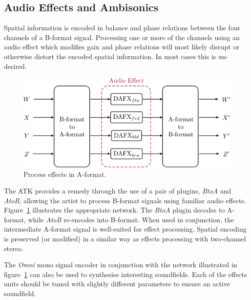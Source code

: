 \documentclass{article}
\begin{document}
\subsection{Audio Effects and Ambisonics}\label{sec:a-format}

Spatial information is encoded in balance and phase relations between the four channels of a B-format signal.
Processing one or more of the channels using an audio effect which modifies gain and phase relations will most likely disrupt or otherwise distort the encoded spatial information. In most cases this is un-desired.

\begin{figure}[h]
\captionsetup{aboveskip=-6pt}
\centering
\includegraphics[width=1.0\columnwidth]{figures/DAFXNetwork.png}
\setlength{\abovecaptionskip}{0pt plus 3pt minus 2pt} %
\caption{Process effects in A-format.\label{fig:aToB}}
\end{figure}

The ATK provides a remedy through the use of a pair of plugins, \emph{BtoA} and \emph{AtoB}, allowing the artist to process B-format signals using familiar audio effects.
Figure~\ref{fig:aToB} illustrates the appropriate network. The \emph{BtoA} plugin decodes to A-format, while \emph{AtoB} re-encodes into B-format.
When used in conjunction, the intermediate A-format signal is well-suited for effect processing. Spatial encoding is preserved (or modified) in a similar way as effects processing with two-channel stereo.

The \emph{Omni} mono signal encoder in conjunction with the network illustrated in figure~\ref{fig:aToB} can also be used to synth\-esise interesting soundfields.
Each of the effects units \linebreak should be tuned with slightly different parameters to ensure an active soundfield.
\end{document}
